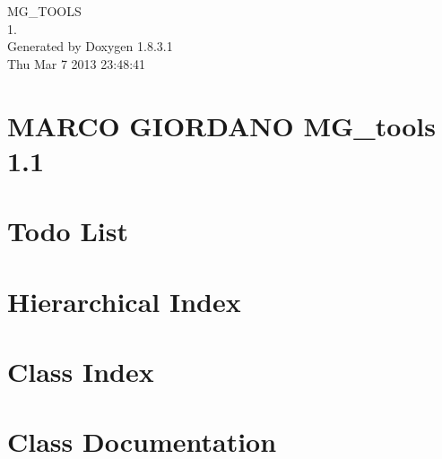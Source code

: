 \documentclass{book}
\begin{document}
\hypersetup{pageanchor=false,citecolor=blue}
\begin{titlepage}
\vspace*{7cm}
\begin{center}
{\Large M\-G\-\_\-\-T\-O\-O\-L\-S \\[1ex]\large 1. }\\
\vspace*{1cm}
{\large Generated by Doxygen 1.8.3.1}\\
\vspace*{0.5cm}
{\small Thu Mar 7 2013 23:48:41}\\
\end{center}
\end{titlepage}
\clearemptydoublepage
{}
\tableofcontents
\clearemptydoublepage
{}
\hypersetup{pageanchor=true,citecolor=blue}
\chapter{M\-A\-R\-C\-O G\-I\-O\-R\-D\-A\-N\-O M\-G\-\_\-tools 1.1}
\label{index}\hypertarget{index}{}
\chapter{Todo List}
\label{todo}
\hypertarget{todo}{}

\chapter{Hierarchical Index}

\chapter{Class Index}

\chapter{Class Documentation}















\printindex
\end{document}
